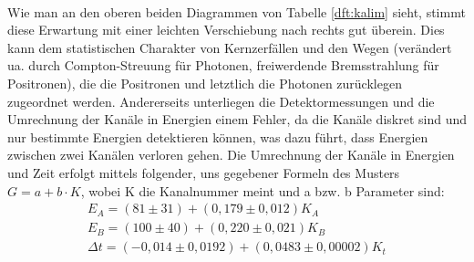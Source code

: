        \label{dft:kalim}
       \ \\
       Wie man an den oberen beiden Diagrammen von Tabelle \ref{dft:kalim} sieht, stimmt diese Erwartung mit einer leichten Verschiebung nach rechts gut überein. Dies kann
       dem statistischen Charakter von Kernzerfällen und den Wegen (verändert ua. durch Compton-Streuung für Photonen, freiwerdende Bremsstrahlung für Positronen), die die 
       Positronen und letztlich die Photonen zurücklegen zugeordnet werden. Andererseits unterliegen die Detektormessungen und die Umrechnung der Kanäle in Energien einem 
       Fehler, da die Kanäle diskret sind und nur bestimmte Energien detektieren können, was dazu führt, dass Energien zwischen zwei Kanälen verloren gehen.
       Die Umrechnung der Kanäle in Energien und Zeit erfolgt mittels folgender, uns gegebener Formeln des Musters $G = a + b \cdot K$, wobei K die Kanalnummer meint und a
       bzw. b Parameter sind:
       \begin{gather*}
           E_A = (81\pm 31) + (0,179\pm 0,012)K_A\\
           E_B = (100\pm 40) + (0,220\pm 0,021)K_B\\
           \Delta t = (-0,014\pm 0,0192) + (0,0483\pm 0,00002)K_t
       \end{gather*}
       

